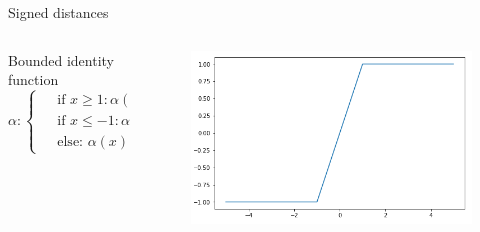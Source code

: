 


\begin{frame}{\tciii{} Signed distances}

\begin{columns}
\begin{column}{0.45\linewidth}
\begin{block}{Bounded identity function}
\begin{equation}
\alpha: \begin{cases}
& \text{ if } x \geq 1: \alpha(x) = 1\\ 
& \text{ if } x \leq -1: \alpha(x) = -1\\ 
& \text{ else: }  \alpha(x) = x
\end{cases}
\end{equation}
\end{block}
\end{column}

\begin{column}{0.45\linewidth}
\begin{figure}
\centering
\includegraphics[width=.9\linewidth]{images/GENE/images/bounded.png}
\end{figure}
\end{column}
\end{columns}

\end{frame}


